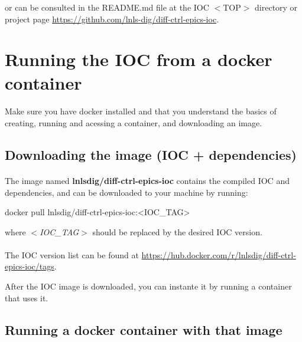 \documentclass[openany]{article}
\begin{document}
    or can be consulted in the README.md file at the IOC $<$TOP$>$ directory or project page \url{https://github.com/lnls-dig/diff-ctrl-epics-ioc}.

\section{Running the IOC from a docker container}\label{sec:run-with-docker}

    \paragraph{} Make sure you have docker installed and that you understand the basics of creating, running and acessing a container, and downloading an image.

    \subsection{Downloading the image (IOC + dependencies)}

        \paragraph{} The image named \textbf{lnlsdig/diff-ctrl-epics-ioc} contains the compiled IOC and dependencies, and can be downloaded to your machine by running:

        \vspace{1mm}
        \begin{code}
docker pull lnlsdig/diff-ctrl-epics-ioc:<IOC_TAG>
        \end{code}
        \vspace{1mm}

        where \emph{$<$IOC\_TAG$>$} should be replaced by the desired IOC version.

        \paragraph{} The IOC version list can be found at \url{https://hub.docker.com/r/lnlsdig/diff-ctrl-epics-ioc/tags}.

        After the IOC image is downloaded, you can instante it by running a container that uses it.

    \subsection{Running a docker container with that image}
\end{document}
